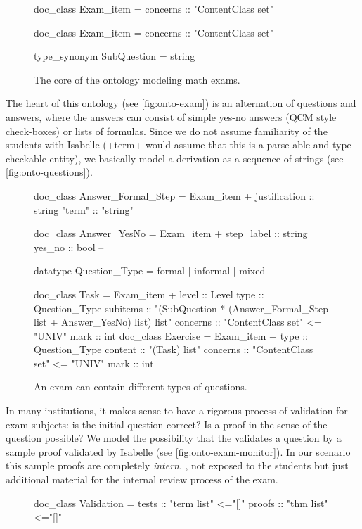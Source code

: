 \begin{isabellebody}
\begin{isamarkuptext}
\begin{figure}
\begin{isar}
doc_class Exam_item = 
  concerns :: "ContentClass set"  

doc_class Exam_item = 
  concerns :: "ContentClass set"  

type_synonym SubQuestion = string
\end{isar}
\caption{The core of the ontology modeling math exams.}
\label{fig:onto-exam}
\end{figure}
The heart of this ontology (see \autoref{fig:onto-exam}) is an alternation of questions and answers, 
where the answers can consist of simple yes-no answers (QCM style check-boxes) or lists of formulas. 
Since we do not
assume familiarity of the students with Isabelle (\inlineisar+term+ would assume that this is a 
parse-able and type-checkable entity), we basically model a derivation as a sequence of strings
(see \autoref{fig:onto-questions}).
\begin{figure}
\begin{isar}
doc_class Answer_Formal_Step =  Exam_item +
  justification :: string
  "term"        :: "string" 
  
doc_class Answer_YesNo =  Exam_item +
  step_label :: string
  yes_no     :: bool  -- 

datatype Question_Type =   
  formal | informal | mixed 
  
doc_class Task = Exam_item +
  level    :: Level
  type     :: Question_Type
  subitems :: "(SubQuestion * 
                   (Answer_Formal_Step list + Answer_YesNo) list) list"
  concerns :: "ContentClass set" <= "UNIV" 
  mark     :: int
doc_class Exercise = Exam_item +
  type     :: Question_Type
  content  :: "(Task) list"
  concerns :: "ContentClass set" <= "UNIV" 
  mark     :: int
\end{isar}
\caption{An exam can contain different types of questions.}
\label{fig:onto-questions}
\end{figure}

In many institutions, it makes sense to have a rigorous process of validation
for exam subjects: is the initial question correct? Is a proof in the sense of the
question possible? We model the possibility that the  validates a 
question by a sample proof validated by Isabelle (see \autoref{fig:onto-exam-monitor}). In our scenario this sample proofs
are completely \emph{intern}, \ie, not exposed to the students but just additional
material for the internal review process of the exam.
\begin{figure}
\begin{isar}
doc_class Validation = 
   tests  :: "term list"  <="[]"
   proofs :: "thm list"   <="[]"
  

\end{isar}
\end{figure}
\end{isamarkuptext}
\end{isabellebody}
